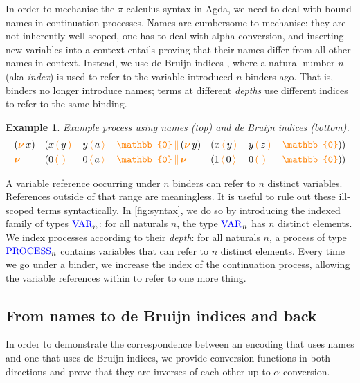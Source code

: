 \documentclass[sigplan,10pt,anonymous,review]{acmart}
\newtheorem{example}{Example}
\theoremstyle{definition}
\newcommand{\picalc}{$\pi$-calculus}
\newcommand{\type}[1]{\textcolor{blue}{\operatorname{#1}}}
\newcommand{\constr}[1]{\textcolor{orange}{\operatorname{#1}}}
\newcommand{\PO}{\constr{\mathbb{0}}}
\newcommand{\comp}[2]{#1 \, \constr{\parallel} \, #2}
\newcommand{\new}{\constr{\boldsymbol{\nu}} \,}
\newcommand{\send}[2]{#1 \, \constr{\langle} \, #2 \,\constr{\rangle} \,}
\newcommand{\recv}[2]{#1 \, \constr{\mathbb{(}} \, #2 \, \constr{\mathbb{)}} \,}
\newcommand{\Var}{\type{VAR}}
\newcommand{\Process}{\type{PROCESS}}
\begin{document}
In order to mechanise the \picalc{} syntax in Agda, we need to deal with bound names in continuation processes.
Names are cumbersome to mechanise: they are not inherently well-scoped, one has to deal with alpha-conversion, and inserting new variables into a context entails proving that their names differ from all other names in context.
Instead, we use de Bruijn indices \cite{deBruijn1972}, where a natural number $n$ (aka \emph{index}) is used to refer to the variable introduced $n$ binders ago.
That is, binders no longer introduce names; terms at different \emph{depths} use different indices to refer to the same binding.
\begin{example}
  Example process using names (top) and de Bruijn indices (bottom).
  \small
  \begin{equation*}
    \begin{aligned}
      & (\new{}x ) && (\comp {\recv{x}{y} && \send{y}{a} && \PO} {(\new{} y) && (\send{x}{y} && \recv{y}{z} && \PO)}) \\
      & \new{} && (\comp {\recv{0}{} && \send{0}{a} && \PO} {\new{} && (\send{1}{0} && \recv{0}{} && \PO)}) \\
    \end{aligned}
  \end{equation*}
\end{example}

A variable reference occurring under $n$ binders can refer to $n$ distinct variables.
References outside of that range are meaningless.
It is useful to rule out these ill-scoped terms syntactically.
In \autoref{fig:syntax}, we do so by introducing the indexed family of types \cite{Dybjer1994} $\Var_n$: for all naturals $n$, the type $\Var_n$ has $n$ distinct elements.
We index processes according to their \emph{depth}: for all naturals $n$, a process of type $\Process_n$ contains variables that can refer to $n$ distinct elements.
Every time we go under a binder, we increase the index of the continuation process, allowing the variable references within to refer to one more thing.

\subsection{From names to de Bruijn indices and back}

In order to demonstrate the correspondence between an encoding that uses names and one that uses de Bruijn indices, we provide conversion functions in both directions and prove that they are inverses of each other up to $\alpha$-conversion.
\end{document}
